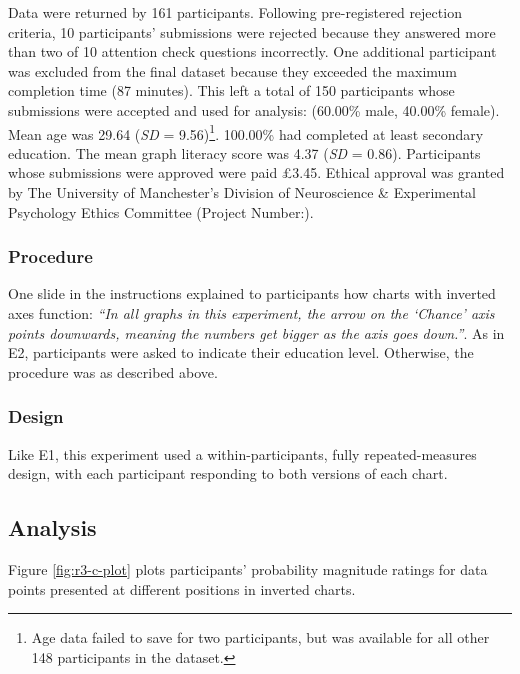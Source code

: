 \documentclass[journal]{vgtc}                %
\begin{document}
Data were returned by 161 participants. Following pre-registered rejection criteria, 10 participants' submissions were rejected because they answered more than two of 10 attention check questions incorrectly. One additional participant was excluded from the final dataset because they exceeded the maximum completion time (87 minutes). This left a total of 150 participants whose submissions were accepted and used for analysis: (60.00\% male, 40.00\% female). Mean age was 29.64 (\emph{SD} = 9.56)\footnote{Age data failed to save for two participants, but was available for all other 148 participants in the dataset.}. 100.00\% had completed at least secondary education. The mean graph literacy score was 4.37 (\emph{SD} = 0.86). Participants whose submissions were approved were paid £3.45. Ethical approval was granted by The University of Manchester's Division of Neuroscience \& Experimental Psychology Ethics Committee (Project Number:).

\hypertarget{procedure-2}{%
\subsubsection{Procedure}\label{procedure-2}}

One slide in the instructions explained to participants how charts with inverted axes function: \emph{``In all graphs in this experiment, the arrow on the `Chance' axis points downwards, meaning the numbers get bigger as the axis goes down.''}. As in E2, participants were asked to indicate their education level. Otherwise, the procedure was as described above.

\hypertarget{design-2}{%
\subsubsection{Design}\label{design-2}}

Like E1, this experiment used a within-participants, fully repeated-measures design, with each participant responding to both versions of each chart.~

\hypertarget{analysis-2}{%
\subsection{Analysis}\label{analysis-2}}

Figure \ref{fig:r3-c-plot} plots participants' probability magnitude ratings for data points presented at different positions in inverted charts.
\end{document}
